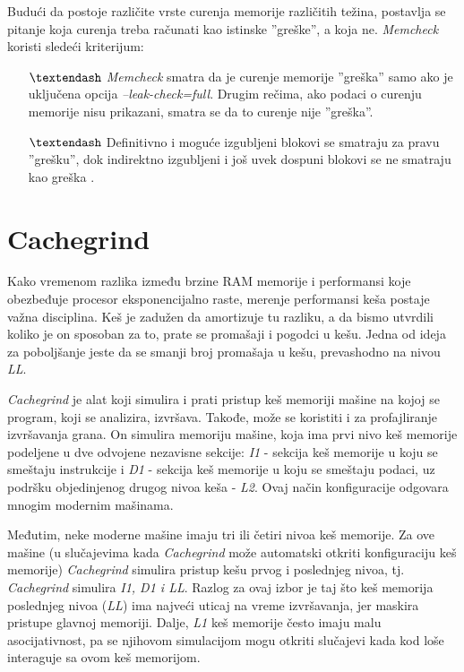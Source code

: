 \documentclass[12pt,oneside]{memoir}
\theoremstyle{plain}
\theoremstyle{definition}
\begin{document}
Budući da postoje različite vrste curenja memorije različitih težina, postavlja se pitanje koja curenja treba računati kao istinske ''greške'', a koja ne. \textit{Memcheck} koristi sledeći kriterijum:
\begin{itemize}
\item[$\textendash$] \textit{Memcheck} smatra da je curenje memorije ''greška'' samo ako je uključena opcija \textit{--leak-check=full}. Drugim rečima, ako podaci o curenju memorije nisu prikazani, smatra se da to curenje nije ''greška''.
\item[$\textendash$] Definitivno i moguće izgubljeni blokovi se smatraju za pravu ''grešku'', dok indirektno izgubljeni i još uvek dospuni blokovi se ne smatraju kao greška \cite{Memcheck}. 
\end{itemize}


\section{Cachegrind}
Kako vremenom razlika između brzine RAM memorije i performansi koje obezbeđuje procesor eksponencijalno raste, merenje performansi keša postaje važna disciplina. Keš je zadužen da amortizuje tu razliku, a da bismo utvrdili koliko je on sposoban za to, prate se promašaji i pogodci u kešu. Jedna od  ideja za poboljšanje jeste da se smanji broj promašaja u kešu, prevashodno na nivou \textit{LL}.

\textit{Cachegrind} je alat koji simulira i prati pristup keš memoriji mašine na kojoj se program, koji se analizira, izvršava. Takođe, može se koristiti i za profajliranje izvršavanja grana. On simulira memoriju mašine, koja ima prvi nivo keš memorije podeljene u dve odvojene nezavisne sekcije: \textit{I1} - sekcija keš memorije u koju se smeštaju instrukcije i \textit{D1} - sekcija keš memorije u koju se smeštaju podaci, uz podršku objedinjenog drugog nivoa keša - \textit{L2}. Ovaj način konfiguracije odgovara mnogim modernim mašinama.


Međutim, neke moderne mašine imaju tri ili četiri nivoa keš memorije. Za ove mašine (u slučajevima kada \textit{Cachegrind} može automatski otkriti konfiguraciju keš memorije) \textit{Cachegrind} simulira pristup kešu prvog i poslednjeg nivoa, tj. \textit{Cachegrind} simulira \textit{I1, D1 i LL}. Razlog za ovaj izbor je taj što keš memorija poslednjeg nivoa (\textit{LL}) ima najveći uticaj na vreme izvršavanja, jer maskira pristupe glavnoj memoriji. Dalje, \textit{L1} keš memorije često imaju malu asocijativnost, pa se njihovom simulacijom mogu otkriti slučajevi kada kod loše interaguje sa ovom keš memorijom.
\end{document}
